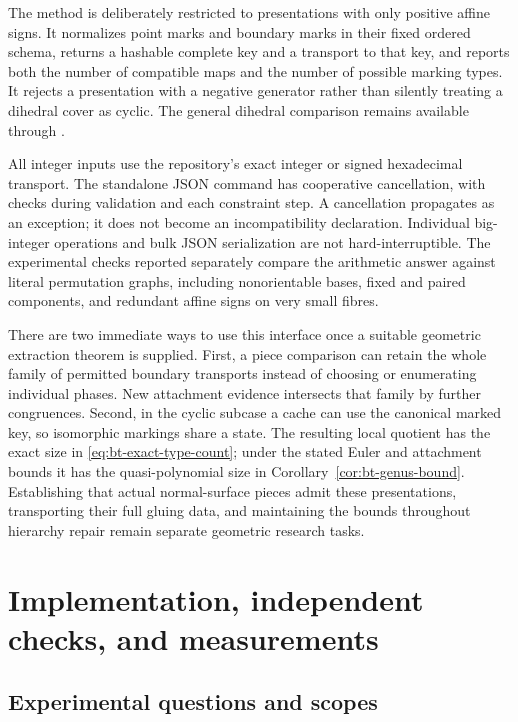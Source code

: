 \documentclass[11pt]{article}
\theoremstyle{definition}
\theoremstyle{remark}
\newcommand{\code}[1]{\texttt{\detokenize{#1}}}
\begin{document}
The \code{cyclic_marked_signature} method is deliberately restricted to
presentations with only positive affine signs.  It normalizes point
marks and boundary marks in their fixed ordered schema, returns a
hashable complete key and a transport to that key, and reports both the
number of compatible maps and the number of possible marking types.
It rejects a presentation with a negative generator rather than silently
treating a dihedral cover as cyclic.  The general dihedral comparison
remains available through \code{transports}.

All integer inputs use the repository's exact integer or signed
hexadecimal transport.  The standalone JSON command has cooperative
cancellation, with checks during validation and each constraint step.
A cancellation propagates as an exception; it does not become an
incompatibility declaration.  Individual big-integer operations and
bulk JSON serialization are not hard-interruptible.  The experimental
checks reported separately compare the arithmetic answer against
literal permutation graphs, including nonorientable bases, fixed and
paired components, and redundant affine signs on very small fibres.

There are two immediate ways to use this interface once a suitable
geometric extraction theorem is supplied.  First, a piece comparison can
retain the whole family of permitted boundary transports instead of
choosing or enumerating individual phases.  New attachment evidence
intersects that family by further congruences.  Second, in the cyclic
subcase a cache can use the canonical marked key, so isomorphic markings
share a state.  The resulting local quotient has the exact size in
\eqref{eq:bt-exact-type-count}; under the stated Euler and attachment
bounds it has the quasi-polynomial size in
Corollary~\ref{cor:bt-genus-bound}.  Establishing that actual normal-surface
pieces admit these presentations, transporting their full gluing data,
and maintaining the bounds throughout hierarchy repair remain separate
geometric research tasks.

\section{Implementation, independent checks, and measurements}
\label{sec:experiments}

\subsection{Experimental questions and scopes}
\end{document}
